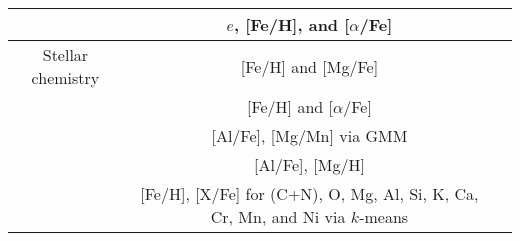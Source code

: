 \begin{table*}
\begin{tabular}{c|c|c}
        & $e$, [Fe/H], and [$\alpha$/Fe] & \citet{Naidu2020} \\
        \hline
        Stellar chemistry & [Fe/H] and [Mg/Fe] & \citet{DiMatteo2019, DiMatteo2020} \\
        & [Fe/H] and [$\alpha$/Fe] & \citet{Carollo2021} \\
        & [Al/Fe], [Mg/Mn] via GMM & \citet{Das2020} \\
        & [Al/Fe], [Mg/H] & \citet{Feuillet2021} \\
        & [Fe/H], [X/Fe] for (C+N), O, Mg, Al, Si, K, Ca, Cr, Mn, and Ni via $k$-means & \citet{Hayes2018} \\
        \hline
    \end{tabular}
    \label{tab:selection_techniques}
\end{table*}


